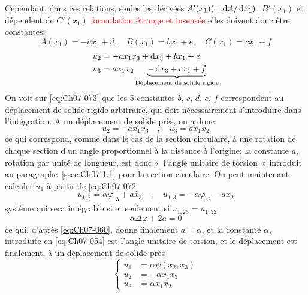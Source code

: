 Cependant, dans ces relations, seules les dérivées $A'(x_1) (=\mathop{\mathrm{{}d}}\mathopen{} A /\mathop{\mathrm{{}d}}\mathopen{} x_1)$, $B'(x_1)$ et dépendent de $C'(x_1)$ \textcolor{red}{formulation étrange et insensée} elles doivent donc être constantes:
\begin{equation}
A(x_1) = -a x_1 +d,\quad B(x_1) = b x_1 +e,\quad C(x_1) = c x_1 +f
\end{equation}
\begin{equation}
    \begin{aligned}
        u_2 &= -a x_1 x_3 + \mathop{\mathrm{{}d}}\mathopen{} x_3 + b x_1 + e\\
        u_3 &= a x_1 x_2 \underbrace{- \mathop{\mathrm{{}d}}\mathopen{} x_3 + c x_1 + f}_{\text{Déplacement de solide rigide}}
    \end{aligned}
    \label{eq:Ch07-073} 
\end{equation}
On voit sur \eqref{eq:Ch07-073} que les 5 constantes $b$, $c$, $d$, $e$, $f$ correspondent au déplacement de solide rigide arbitraire, qui doit nécessairement s'introduire dans l'intégration.
A un déplacement de solide près, on a donc 
\begin{equation}
    u_2 = -a x_1 x_3 \quad , \quad u_3 = a x_1 x_2
    \label{eq:Ch07-074}
\end{equation}
ce qui correspond, comme dans le cas de la section circulaire, à une rotation de chaque section d'un angle proportionnel à la distance à l'origine; la constante $a$, rotation par unité de longueur, est donc «~l'angle unitaire de torsion~» introduit au paragraphe~\ref{ssec:Ch07-1.1} pour la section circulaire.
On peut maintenant calculer $u_1$ à partir de \eqref{eq:Ch07-072} 
\begin{equation}
    u_{1,2} = \alpha \varphi_{,3} + a x_3 \quad , \quad u_{1,3} = -\alpha \varphi_{,2} - a x_2
    \label{eq:Ch07-075}
\end{equation}
système qui sera intégrable si et seulement si $u_{1,23} = u_{1,32}$
\begin{displaymath}
    \alpha \Delta \varphi + 2 a = 0
\end{displaymath}
ce qui, d'après \eqref{eq:Ch07-060}, donne finalement $a=\alpha$, et la constante $\alpha$, introduite en \eqref{eq:Ch07-054} est l'angle unitaire de torsion, et le déplacement est finalement, à un déplacement de solide près 
\begin{equation}
    \left\{
    \begin{aligned}
        u_1 &= \alpha \psi (x_2, x_3) \\
        u_2 &= - \alpha x_1 x_3 \\
        u_3 &= \alpha x_1 x_2
    \end{aligned}
    \right.
    \label{eq:Ch07-076}
\end{equation}
